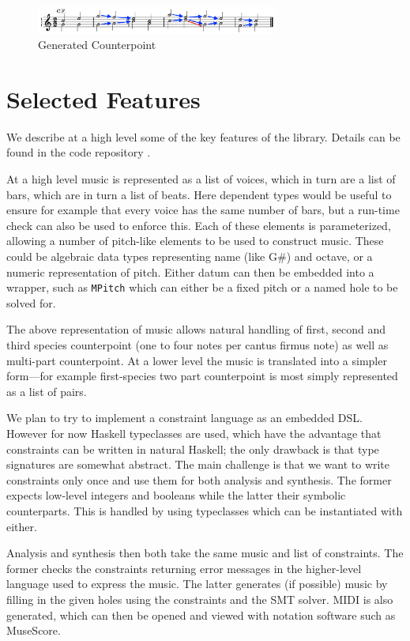 \documentclass[sigplan,screen]{acmart}
\begin{document}
\begin{figure}
  \includegraphics[width=8cm]{figures/b146gen.png}
  \caption{Generated Counterpoint}
  \label{fig:b146gen3}
\end{figure}


\section{Selected Features}

We describe at a high level some of the key features of the
library. Details can be found in the code repository
\citep{HaskellCounterpoint}.

At a high level music is represented as a list of voices, which in
turn are a list of bars, which are in turn a list of beats. Here
dependent types would be useful to ensure for example that every voice
has the same number of bars, but a run-time check can also be used to
enforce this. Each of these elements is parameterized, allowing a
number of pitch-like elements to be used to construct music. These
could be algebraic data types representing name (like G\#) and
octave, or a numeric representation of pitch. Either datum can then be
embedded into a wrapper, such as \texttt{MPitch} which can either be a
fixed pitch or a named hole to be solved for.

The above representation of music allows natural handling of first,
second and third species counterpoint (one to four notes per cantus
firmus note) as well as multi-part counterpoint. At a lower level the
music is translated into a simpler form---for example first-species
two part counterpoint is most simply represented as a list of pairs.

We plan to try to implement a constraint language as an embedded
DSL. However for now Haskell typeclasses are used, which have the
advantage that constraints can be written in natural Haskell; the only
drawback is that type signatures are somewhat abstract. The main
challenge is that we want to write constraints only once and use them
for both analysis and synthesis. The former expects low-level integers
and booleans while the latter their symbolic counterparts. This is
handled by using typeclasses which can be instantiated with either.

Analysis and synthesis then both take the same music and list of
constraints. The former checks the constraints returning error
messages in the higher-level language used to express the music. The
latter generates (if possible) music by filling in the given holes
using the constraints and the SMT solver. MIDI is also generated,
which can then be opened and viewed with notation software such as
MuseScore.
\end{document}
